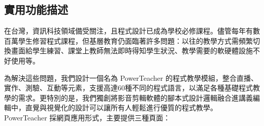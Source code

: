 \documentclass[12pt]{article}
\begin{document}
\subsection{實用功能描述}
\par 在台灣，資訊科技領域備受關注，且程式設計已成為學校必修課程。儘管每年有數百萬學生修習程式課程，但基層教育仍面臨著許多問題：以往的教學方式需頻繁切換畫面給學生練習、課堂上教師無法即時得知學生狀況、教學需要的軟硬體設施不好使用等。\\
\par 為解決這些問題，我們設計一個名為 PowerTeacher 的程式教學模組，整合直播、實作、測驗、互動等元素，支援高達60種不同的程式語言，以滿足各種基礎程式教學的需求。更特別的是，我們獨創將影音剪輯軟體的腳本式設計邏輯融合進講義編輯中，直覺與視覺化的設計可以讓所有人輕鬆進行優質的程式教學。PowerTeacher 採網頁應用形式，主要提供三種頁面：\\
\end{document}

